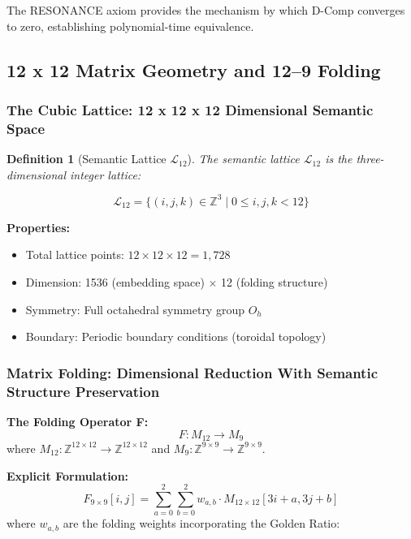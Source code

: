 \documentclass[11pt, letterpaper]{article}
\newtheorem{definition}[theorem]{Definition}
\begin{document}
The RESONANCE axiom provides the mechanism by which D-Comp converges to zero, establishing polynomial-time equivalence.

\subsection{12 x 12 Matrix Geometry and 12{--}9 Folding}

\subsubsection{The Cubic Lattice: 12 x 12 x 12 Dimensional Semantic Space}

\begin{definition}[Semantic Lattice $\mathcal{L}_{12}$]
The semantic lattice $\mathcal{L}_{12}$ is the three-dimensional integer lattice:

\begin{equation}
\mathcal{L}_{12} = \{ (i,j,k) \in \mathbb{Z}^3 \mid 0 \leq i, j, k < 12 \}
\end{equation}
\end{definition}

\textbf{Properties:}
\begin{itemize}
    \item Total lattice points: $12 \times 12 \times 12 = 1,728$
    \item Dimension: 1536 (embedding space) $\times$ 12 (folding structure)
    \item Symmetry: Full octahedral symmetry group $O_h$
    \item Boundary: Periodic boundary conditions (toroidal topology)
\end{itemize}

\subsubsection{Matrix Folding: Dimensional Reduction With Semantic Structure Preservation}

\textbf{The Folding Operator F:}
\begin{equation}
F: M_{12} \rightarrow M_9
\end{equation}
where $M_{12}: \mathbb{Z}^{12 \times 12} \rightarrow \mathbb{Z}^{12 \times 12}$ and $M_9: \mathbb{Z}^{9 \times 9} \rightarrow \mathbb{Z}^{9 \times 9}$.

\textbf{Explicit Formulation:}
\begin{equation}
F_{9 \times 9}[i,j] = \sum_{a=0}^{2} \sum_{b=0}^{2} w_{a,b} \cdot M_{12 \times 12}[3i+a, 3j+b]
\end{equation}
where $w_{a,b}$ are the folding weights incorporating the Golden Ratio:
\end{document}
